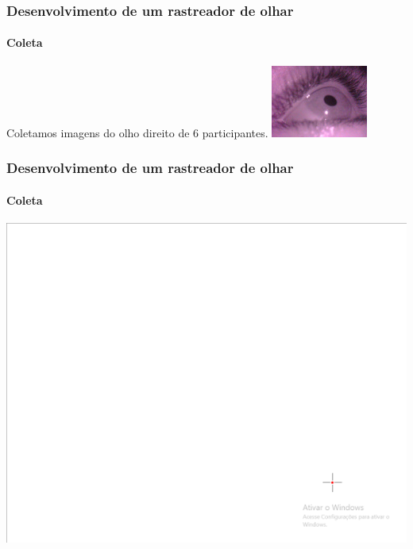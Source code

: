 \documentclass[11pt]{beamer}
\begin{document}
\begin{frame}
\frametitle{Desenvolvimento de um rastreador de olhar}
\framesubtitle{Coleta}

Coletamos imagens do olho direito de $6$ participantes.
\centering
\includegraphics[scale=1]{imagens/26.jpg}
\end{frame}

\begin{frame}
\frametitle{Desenvolvimento de um rastreador de olhar}
\framesubtitle{Coleta}

\centering
\includegraphics[scale=.6]{imagens/alvo.png}
\end{frame}
\end{document}
